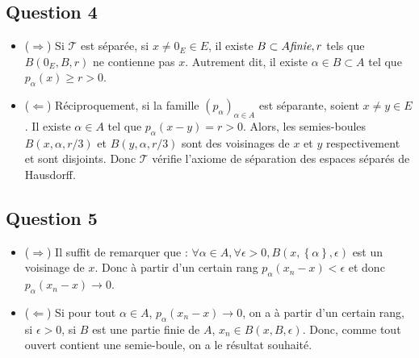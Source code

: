 \documentclass{cours}
\begin{document}
        \subsection{Question 4}
            \begin{itemize}
                \item ($\Rightarrow$) Si $\mathcal{T}$ est séparée, si $x \neq 0_{E} \in E$, il existe $B \subset A \emph{finie}, r$ tels que $B(0_{E}, B, r)$ ne contienne pas $x$. Autrement dit, il existe $\alpha \in B \subset A$ tel que $p_{\alpha}(x) \geq r > 0$.
                \item ($\Leftarrow$) Réciproquement, si la famille $\left(p_{\alpha}\right)_{\alpha \in A}$ est séparante, soient $x \neq y \in E$. Il existe $\alpha \in A$ tel que $p_{\alpha}(x-y) = r > 0$. Alors, les semies-boules $B(x, {\alpha}, r/3)$ et $B(y, {\alpha}, r/3)$ sont des voisinages de $x$ et $y$ respectivement et sont disjoints. Donc $\mathcal{T}$ vérifie l'axiome de séparation des espaces séparés de Hausdorff.
            \end{itemize}

        \subsection{Question 5}
            \begin{itemize}
                \item ($\Rightarrow$) Il suffit de remarquer que : $\forall \alpha \in A, \forall \epsilon > 0, B(x, \left\{\alpha\right\}, \epsilon)$ est un voisinage de $x$. Donc à partir d'un certain rang $p_{\alpha}(x_{n} - x) < \epsilon$ et donc $p_{\alpha}(x_{n} - x) \to 0$.
                \item ($\Leftarrow$) Si pour tout $\alpha \in A$, $p_{\alpha}(x_{n} - x) \to 0$, on a à partir d'un certain rang, si $\epsilon > 0$, si $B$ est une partie finie de $A$, $x_{n} \in B(x, B, \epsilon)$. Donc, comme tout ouvert contient une semie-boule, on a le résultat souhaité. 
            \end{itemize}
        
\end{document}
